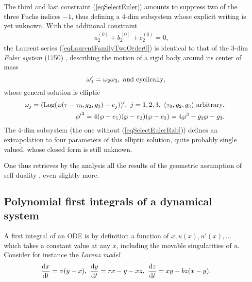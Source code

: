 \documentclass[10pt]{article}
\begin{document}
The third and last constraint (\ref{eqSelectEuler})
amounts to suppress two of the three Fuchs indices $-1$,
thus defining a 4-dim subsystem whose explicit writing is yet unknown.
With the additional constraint
\begin{eqnarray}
& &
a_{2}^{(0)}+b_{2}^{(0)}+c_{2}^{(0)}= 0,
\label{eqSelectEulerRab}
\end{eqnarray}
the Laurent series (\ref{eqLaurentFamilyTwoOrder0}) is identical to that of
the 3-dim \textit{Euler system} (1750) \cite{BGPP},
describing the motion of a rigid body around its center of mass
\begin{equation}
\omega_1' = \omega_2 \omega_3,
\hbox{ and cyclically},
\label{eqEuler}
\end{equation}
whose general solution is elliptic \cite{BGPP}
\begin{eqnarray}
& &
{\hskip -5.0 truemm}
\omega_j= (\Log (\wp(\tau - \tau_0,g_2,g_3)-e_j))',\ j=1,2,3,\
(\tau_0,g_2,g_3) \hbox{ arbitrary},
\\
& &
{\hskip -5.0 truemm}
{\wp'}^2=4 (\wp-e_1)(\wp-e_2)(\wp-e_3)=4 \wp^3 - g_2 \wp - g_3.
\end{eqnarray}
The 4-dim subsystem (the one without (\ref{eqSelectEulerRab}))
defines an extrapolation to four parameters of this elliptic solution,
quite probably single valued, whose closed form is still unknown.

One thus retrieves by the analysis all the results of the geometric 
assumption of self-duality \cite{GibbonsPope1979},
even slightly more.

\subsection{Polynomial first integrals of a dynamical system}
\label{sectionLorenzFI}

A first integral of an ODE is by definition a function of $x,u(x),u'(x),\dots$
which takes a constant value at any $x$,
including the movable singularities of $u$.
Consider for instance the
\textit{Lorenz model}
\begin{equation}
\frac{\hbox{d} x}{\hbox{d} t} = \sigma (y-x),\
\frac{\hbox{d} y}{\hbox{d} t} = r x - y - x z,\
\frac{\hbox{d} z}{\hbox{d} t} = x y - b z (x-y).
\label{eqLorenz}
\end{equation}
\end{document}
